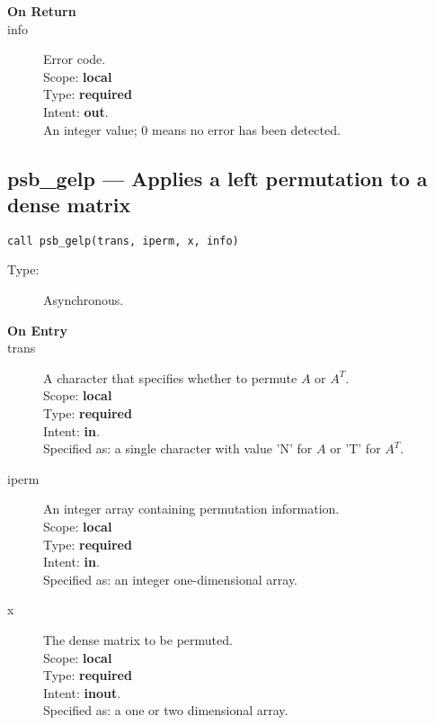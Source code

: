 \begin{description}
\item[\bf On Return]
\item[info] Error code.\\
Scope: {\bf local} \\
Type: {\bf required} \\
Intent: {\bf out}.\\
An integer value; 0 means no error has been detected. 
\end{description}


%
%
\clearpage\subsection{psb\_gelp --- Applies a left permutation to a dense
  matrix}

\begin{verbatim}
call psb_gelp(trans, iperm, x, info)
\end{verbatim}

\begin{description}
\item[Type:] Asynchronous.
\item[\bf On Entry]
\item[trans] A character that specifies whether to permute $A$  or $A^T$.\\
Scope: {\bf local} \\
Type: {\bf required}\\
Intent: {\bf in}.\\
Specified as: a single character with value 'N' for $A$ or 'T' for $A^T$.\\
\item[iperm] An integer array containing permutation information.\\
Scope: {\bf local} \\
Type: {\bf required}\\
Intent: {\bf in}.\\
Specified as: an integer one-dimensional array.\\
\item[x] The dense matrix to be permuted.\\
Scope: {\bf local} \\
Type: {\bf required}\\
Intent: {\bf inout}.\\
Specified as: a one or two dimensional array.\\
\end{description}


